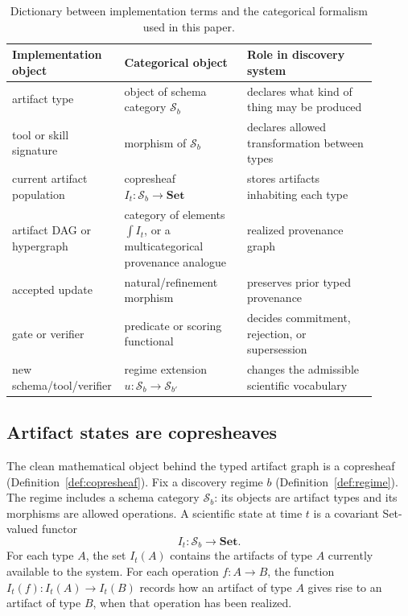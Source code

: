 \documentclass[11pt]{article}
\theoremstyle{definition}
\newcommand{\Sschema}{\mathcal{S}}
\newcommand{\Set}{\mathbf{Set}}
\begin{document}
\begin{table}[t]
\centering
\footnotesize
\setlength{\tabcolsep}{4pt}
\begin{tabular}{@{}>{\raggedright\arraybackslash}p{0.22\linewidth}>{\raggedright\arraybackslash}p{0.33\linewidth}>{\raggedright\arraybackslash}p{0.35\linewidth}@{}}
\toprule
Implementation object & Categorical object & Role in discovery system \\
\midrule
artifact type & object of schema category $\Sschema_b$ & declares what kind of thing may be produced \\
tool or skill signature & morphism of $\Sschema_b$ & declares allowed transformation between types \\
current artifact population & copresheaf $I_t:\Sschema_b\to\Set$ & stores artifacts inhabiting each type \\
artifact DAG or hypergraph & category of elements $\int I_t$, or a multicategorical provenance analogue & realized provenance graph \\
accepted update & natural/refinement morphism & preserves prior typed provenance \\
gate or verifier & predicate or scoring functional & decides commitment, rejection, or supersession \\
new schema/tool/verifier & regime extension $u:\Sschema_b\to\Sschema_{b'}$ & changes the admissible scientific vocabulary \\
\bottomrule
\end{tabular}
\caption{Dictionary between implementation terms and the categorical formalism used in this paper.}
\label{tab:dictionary}
\end{table}

\subsection{Artifact states are copresheaves}
\label{sec:copresheaf_results}

The clean mathematical object behind the typed artifact graph is a copresheaf (Definition~\ref{def:copresheaf}). Fix a discovery regime $b$ (Definition~\ref{def:regime}). The regime includes a schema category $\Sschema_b$: its objects are artifact types and its morphisms are allowed operations. A scientific state at time $t$ is a covariant Set-valued functor
\begin{equation}
I_t:\Sschema_b\longrightarrow \Set .
\label{eq:copresheaf_state}
\end{equation}
For each type $A$, the set $I_t(A)$ contains the artifacts of type $A$ currently available to the system. For each operation $f:A\to B$, the function $I_t(f):I_t(A)\to I_t(B)$ records how an artifact of type $A$ gives rise to an artifact of type $B$, when that operation has been realized.
\end{document}
